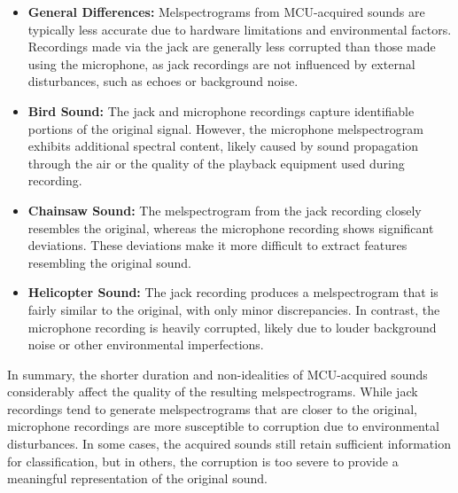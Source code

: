 \documentclass{article}
\begin{document}
\begin{itemize}
    \item \textbf{General Differences:} Melspectrograms from MCU-acquired sounds are typically less accurate due to hardware limitations and environmental factors. Recordings made via the jack are generally less corrupted than those made using the microphone, as jack recordings are not influenced by external disturbances, such as echoes or background noise.
    
    \item \textbf{Bird Sound:} The jack and microphone recordings capture identifiable portions of the original signal. However, the microphone melspectrogram exhibits additional spectral content, likely caused by sound propagation through the air or the quality of the playback equipment used during recording.
    
    \item \textbf{Chainsaw Sound:} The melspectrogram from the jack recording closely resembles the original, whereas the microphone recording shows significant deviations. These deviations make it more difficult to extract features resembling the original sound.
    
    \item \textbf{Helicopter Sound:} The jack recording produces a melspectrogram that is fairly similar to the original, with only minor discrepancies. In contrast, the microphone recording is heavily corrupted, likely due to louder background noise or other environmental imperfections.
\end{itemize}

In summary, the shorter duration and non-idealities of MCU-acquired sounds considerably affect the quality of the resulting melspectrograms. While jack recordings tend to generate melspectrograms that are closer to the original, microphone recordings are more susceptible to corruption due to environmental disturbances. In some cases, the acquired sounds still retain sufficient information for classification, but in others, the corruption is too severe to provide a meaningful representation of the original sound.
\end{document}
